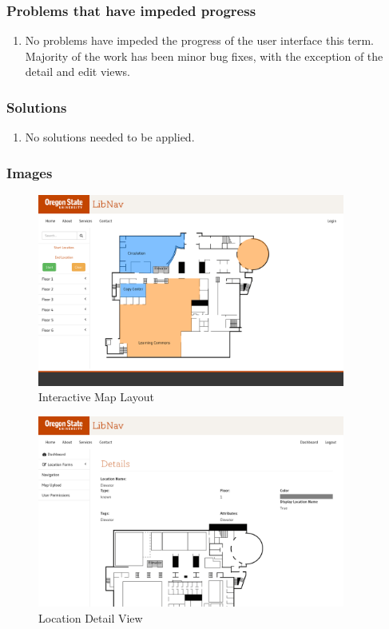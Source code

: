 \documentclass[letterpaper,10pt,serif,titlepage, onecolumn, compsoc]{IEEEtran}
\begin{document}
\subsubsection{Problems that have impeded progress}
\begin{enumerate}
	\item No problems have impeded the progress of the user interface this term. Majority of the work has been minor bug fixes, with the exception of the detail and edit views. 
\end{enumerate}

\subsubsection{Solutions}
\begin{enumerate}
	\item No solutions needed to be applied.
\end{enumerate}

\newpage

\subsubsection{Images}
\begin{figure}[h!]
\centering
\captionsetup{justification=centering,margin=2cm}
\includegraphics[width=0.90\textwidth,natwidth=1200,natheight=800]{images/main-page.png}
\caption{Interactive Map Layout}
\label{fig:method}
\end{figure}

\FloatBarrier
\begin{figure}[h!]
\centering
\captionsetup{justification=centering,margin=2cm}
\includegraphics[width=0.90\textwidth,natwidth=1200,natheight=800]{images/detail-view.png}
\caption{Location Detail View}
\label{fig:method}
\end{figure}
\end{document}
